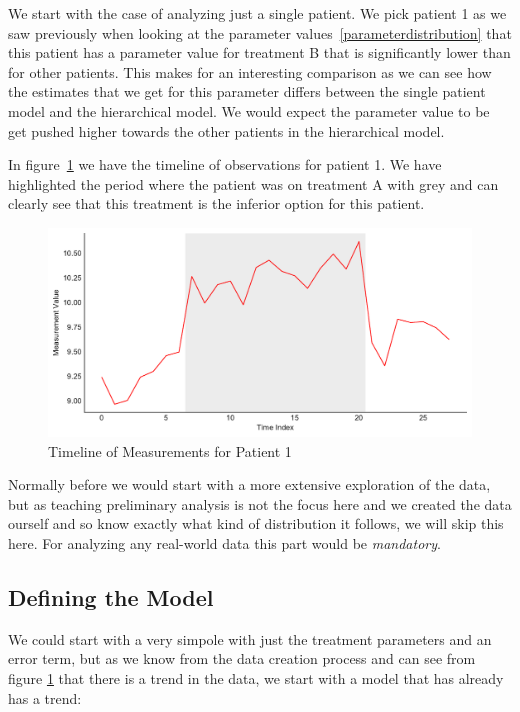 \documentclass[12pt,a4paper,leqno]{report}
\theoremstyle{plain}
\theoremstyle{definition}
\theoremstyle{remark}
\begin{document}
We start with the case of analyzing just a single patient. We pick patient 1 as we saw
previously when looking at the parameter values\ \ref{parameterdistribution} that this patient has a parameter value
for treatment B that is significantly lower than for other patients. This makes for an
interesting comparison as we can see how the estimates that we get for this parameter
differs between the single patient model and the hierarchical model. We would expect the
parameter value to be get pushed higher towards the other patients in the hierarchical
model.

In figure\ \ref{patient1timeline} we have the timeline of observations for patient 1. We
have highlighted the period where the patient was on treatment A with grey and can
clearly see that this treatment is the inferior option for this patient.

\begin{figure}[H]
    \label{patient1timeline}
    \caption{Timeline of Measurements for Patient 1}
    \includegraphics[width=\textwidth,height=\textheight,keepaspectratio]{patient1_timeline.pdf}
\end{figure}

Normally before we would start with a more extensive exploration of the data, but as teaching preliminary analysis
is not the focus here and we created the data ourself and so know exactly what kind
of distribution it follows, we will skip this here. For analyzing any real-world data
this part would be \emph{mandatory}.

\subsection{Defining the Model}

We could start with a very simpole with just the treatment parameters and an error term,
but as we know from the data creation process and can see from figure
\ref{patient1timeline} that there is a trend in the data, we start with a model that has
already has a trend:
\end{document}
